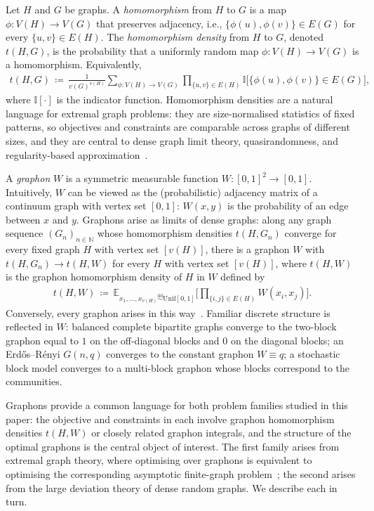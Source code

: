 \documentclass[11pt]{article}
\theoremstyle{plain}
\theoremstyle{definition}
\theoremstyle{remark}
\begin{document}
Let $H$ and $G$ be graphs. A \emph{homomorphism} from $H$ to $G$ is a map $\phi : V(H) \to V(G)$ that preserves adjacency, i.e., $\{\phi(u), \phi(v)\} \in E(G)$ for every $\{u,v\} \in E(H)$. The \emph{homomorphism density} from $H$ to $G$, denoted $t(H, G)$, is the probability that a uniformly random map $\phi : V(H) \to V(G)$ is a homomorphism. Equivalently,
\begin{align}
t(H, G) \,\coloneqq\, {}
\label{eqn:homomorphismdensity}
\frac{1}{v(G)^{v(H)}}
\sum_{\phi : V(H) \to V(G)}
\prod_{\{u,v\} \in E(H)} \mathbb{I}\bigl[\{\phi(u), \phi(v)\} \in E(G)\bigr],
\end{align}
where $\mathbb{I}[\cdot]$ is the indicator function.
Homomorphism densities are a natural language for extremal graph problems: they are size-normalised statistics of fixed patterns, so objectives and constraints are comparable across graphs of different sizes, and they are central to dense graph limit theory, quasirandomness, and regularity-based approximation~\citep{lovasz2012large}.

A \emph{graphon} $W$ is a symmetric measurable function $W : [0,1]^2 \to [0,1]$. Intuitively, $W$ can be viewed as the (probabilistic) adjacency matrix of a continuum graph with vertex set $[0,1]$: $W(x,y)$ is the probability of an edge between $x$ and $y$. Graphons arise as limits of dense graphs: along any graph sequence $(G_n)_{n \in \mathbb{N}}$ whose homomorphism densities $t(H, G_n)$ converge for every fixed graph $H$ with vertex set $[v(H)]$, there is a graphon $W$ with $t(H, G_n) \to t(H, W)$ for every $H$ with vertex set $[v(H)]$, where
$t(H,W)$ is the graphon homomorphism density of $H$ in $W$ defined by
\begin{align}
t(H, W) \,\coloneqq\, \mathbb{E}_{x_1, \ldots, x_{v(H)} \stackrel{\mathrm{iid}}{\sim} \mathrm{Unif}[0,1]}
\Big[ \prod_{\{i,j\} \in E(H)} W(x_i, x_j)\Big].
\label{eqn:homomorphismdensitygraphon}
\end{align}
Conversely, every graphon arises in this way~\citep{lovasz2006limits,lovasz2012large}. Familiar discrete structure is reflected in $W$: balanced complete bipartite graphs converge to the two-block graphon equal to $1$ on the off-diagonal blocks and $0$ on the diagonal blocks; an Erd\H{o}s--R\'enyi $G(n,q)$ converges to the constant graphon $W \equiv q$; a stochastic block model converges to a multi-block graphon whose blocks correspond to the communities.

Graphons provide a common language for both problem families studied in this paper: the objective and constraints in each involve graphon homomorphism densities $t(H,W)$ or closely related graphon integrals, and the structure of the optimal graphons is the central object of interest. The first family arises from extremal graph theory, where optimising over graphons is equivalent to optimising the corresponding asymptotic finite-graph problem~\citep{lovasz2012large}; the second arises from the large deviation theory of dense random graphs. We describe each in turn.
\end{document}
